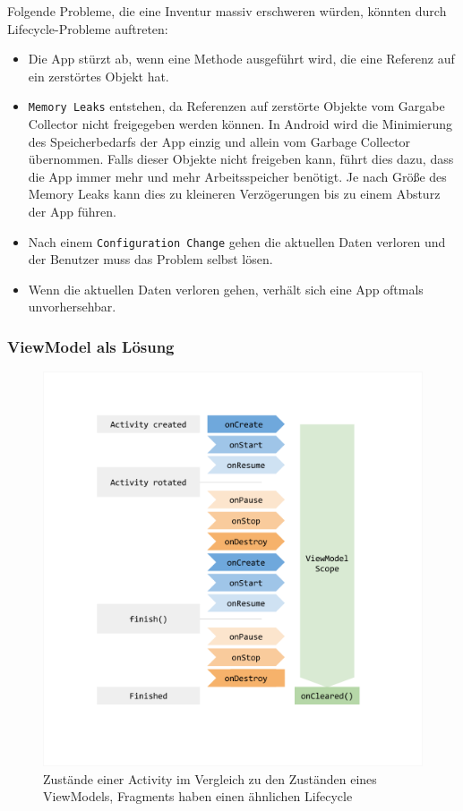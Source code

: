 Folgende Probleme, die eine Inventur massiv erschweren würden, könnten
durch Lifecycle-Probleme auftreten:

\begin{itemize}
\tightlist
\item
  Die App stürzt ab, wenn eine Methode ausgeführt wird, die eine
  Referenz auf ein zerstörtes Objekt hat.
\item
  \texttt{Memory\ Leaks} entstehen, da Referenzen auf zerstörte Objekte
  vom Gargabe Collector nicht freigegeben werden können. In Android wird
  die Minimierung des Speicherbedarfs der App einzig und allein vom
  Garbage Collector übernommen. Falls dieser Objekte nicht freigeben
  kann, führt dies dazu, dass die App immer mehr und mehr
  Arbeitsspeicher benötigt. Je nach Größe des Memory Leaks kann dies zu
  kleineren Verzögerungen bis zu einem Absturz der App führen.
\item
  Nach einem \texttt{Configuration\ Change} gehen die aktuellen Daten
  verloren und der Benutzer muss das Problem selbst lösen.
\item
  Wenn die aktuellen Daten verloren gehen, verhält sich eine App oftmals
  unvorhersehbar.
\end{itemize}

\hypertarget{viewmodel-als-luxf6sung}{%
\subsubsection{ViewModel als Lösung}\label{viewmodel-als-luxf6sung}}

\begin{figure}
\centering
\includegraphics{viewmodel-lifecycle.png}
\caption{Zustände einer Activity im Vergleich zu den Zuständen eines
ViewModels, Fragments haben einen ähnlichen Lifecycle
\cite{fragment-lifecycle} \cite{viewmodel} \cite{life-bild}
\label{fig:vmlife}}
\end{figure}

